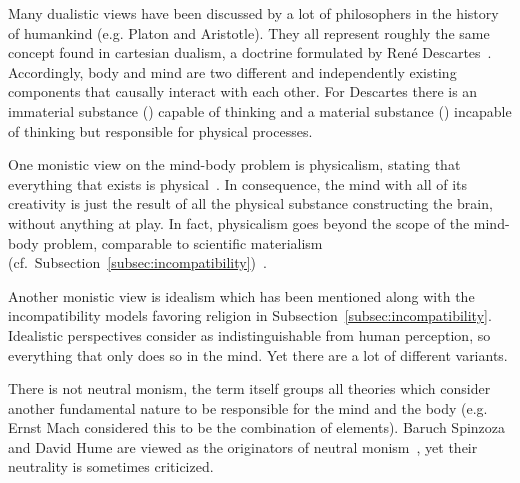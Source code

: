 Many dualistic views have been discussed by a lot of philosophers in the history of humankind (e.g. Platon and Aristotle).
They all represent roughly the same concept found in cartesian dualism, a doctrine formulated by René Descartes~\cite{Leach2017}.
Accordingly, body and mind are two different and independently existing components that causally interact with each other.
For Descartes there is an immaterial substance () capable of thinking and a material substance () incapable of thinking but responsible for physical processes.


One monistic view on the mind-body problem is physicalism, stating that everything that exists is physical~\cite{stoljar2010physicalism}. In consequence, the mind with all of its creativity is just the result of all the physical substance constructing the brain, without anything  at play.
In fact, physicalism goes beyond the scope of the mind-body problem, comparable to scientific materialism (cf.~Subsection~\ref{subsec:incompatibility})~\cite{Crane1990}.

Another monistic view is idealism which has been mentioned along with the incompatibility models favoring religion in Subsection~\ref{subsec:incompatibility}.
Idealistic perspectives consider  as indistinguishable from human perception,
so everything that  only does so in the mind.
Yet there are a lot of different variants.

There is not  neutral monism, the term itself groups all theories which consider another fundamental nature to be responsible for the mind and the body (e.g. Ernst Mach considered this to be the combination of elements).
Baruch Spinzoza and David Hume are viewed as the originators of neutral monism~\cite{rosenkrantz2010historical}, yet their neutrality is sometimes criticized.

